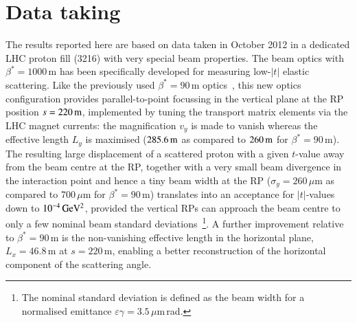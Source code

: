\section{Data taking}
%
The results reported here are based on data taken in October 2012 
in a dedicated LHC proton fill (3216)
with very special beam properties. The beam optics with $\beta^{*} = 1000\,$m
has been specifically developed for measuring low-$|t|$ elastic scattering.
Like the previously used $\beta^{*} = 90\,$m optics~\cite{epl96,epl101-tot,prl111},
this new optics configuration
provides parallel-to-point focussing in the vertical plane at the RP position 
$s = 220\,{\rm m}$, implemented by tuning the transport matrix elements via the
LHC magnet currents: the magnification $v_{y}$ is made to vanish whereas the 
effective length $L_{y}$ is maximised ($285.6\,{\rm m}$ as compared to $260\,{\rm m}$ for 
$\beta^{*} = 90\,$m).
The resulting large displacement of a scattered proton with a given $t$-value 
away from the beam centre at the RP, together with a very small beam 
divergence in the interaction point and hence a tiny beam width 
at the RP ($\sigma_{y} = 260\,\mu$m as compared to 700\,$\mu$m for 
$\beta^{*} = 90\,$m) translates into 
an acceptance for $|t|$-values down to $10^{-4}\,\rm GeV^{2}$, provided the 
vertical RPs can approach the beam centre to only a few nominal beam standard 
deviations~\footnote{The nominal standard deviation is defined as 
the beam width for a normalised emittance 
$\varepsilon \gamma = 3.5\,\mu$m\,rad.}.
A further improvement relative to $\beta^{*} = 90\,$m is the non-vanishing 
effective length in the horizontal plane, $L_{x} = 46.8\,$m at $s = 220\,$m, 
enabling a better reconstruction of the horizontal component of the 
scattering angle.

